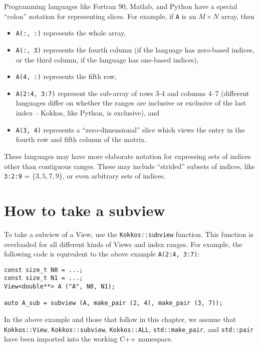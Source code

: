 Programming languages like Fortran 90, Matlab, and Python have a
special ``colon'' notation for representing slices.  For example, if
\texttt{A} is an $M \times N$ array, then
\begin{itemize}
\item \texttt{A(:, :)} represents the whole array,
\item \texttt{A(:, 3)} represents the fourth column (if the language
  has zero-based indices, or the third column, if the language has
  one-based indices),
\item \texttt{A(4, :)} represents the fifth row, 
\item \texttt{A(2:4, 3:7)} represent the sub-array of rows 3-4 and
  columns 4--7 (different languages differ on whether the ranges are
  inclusive or exclusive of the last index -- Kokkos, like Python, is
  exclusive), and
\item \texttt{A(3, 4)} represents a ``zero-dimensional'' slice which
  views the entry in the fourth row and fifth column of the matrix.
\end{itemize}
These languages may have more elaborate notation for expressing sets
of indices other than contiguous ranges.  These may include
``strided'' subsets of indices, like \texttt{3:2:9} = $\{ 3, 5, 7, 9
\}$, or even arbitrary sets of indices.

\section{How to take a subview}\label{S:Subviews:How}

To take a subview of a View, use the \texttt{Kokkos::subview}
function.  This function is overloaded for all different kinds of
Views and index ranges.  For example, the following code is equivalent
to the above example \texttt{A(2:4, 3:7)}:
\begin{lstlisting}
const size_t N0 = ...;
const size_t N1 = ...;
View<double**> A ("A", N0, N1);

auto A_sub = subview (A, make_pair (2, 4), make_pair (3, 7));
\end{lstlisting}
%
In the above example and those that follow in this chapter, 
we assume that \lstinline!Kokkos::View!, \lstinline!Kokkos::subview!,
\lstinline!Kokkos::ALL!, \lstinline!std::make_pair!, and \lstinline!std::pair!
have been imported into the working C++ namespace.

